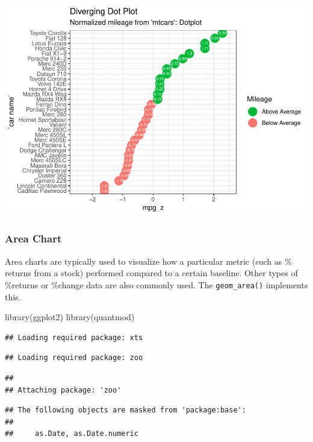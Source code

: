 \documentclass[a4paper]{article}
\newenvironment{Shaded}{}{}
\newcommand{\KeywordTok}[1]{\textcolor[rgb]{0.00,0.00,1.00}{#1}}
\newcommand{\NormalTok}[1]{#1}
\begin{document}
\includegraphics{M24-ggplot2_Gallery_files/figure-latex/unnamed-chunk-14-1.pdf}
\newpage

\subsubsection{Area Chart}\label{area-chart}

Area charts are typically used to visualize how a particular metric
(such as \% returns from a stock) performed compared to a certain
baseline. Other types of \%returns or \%change data are also commonly
used. The \texttt{geom\_area()} implements this.

\begin{Shaded}
\begin{Highlighting}[]
\KeywordTok{library}\NormalTok{(ggplot2)}
\KeywordTok{library}\NormalTok{(quantmod)}
\end{Highlighting}
\end{Shaded}

\begin{verbatim}
## Loading required package: xts
\end{verbatim}

\begin{verbatim}
## Loading required package: zoo
\end{verbatim}

\begin{verbatim}
## 
## Attaching package: 'zoo'
\end{verbatim}

\begin{verbatim}
## The following objects are masked from 'package:base':
## 
##     as.Date, as.Date.numeric
\end{verbatim}
\end{document}
